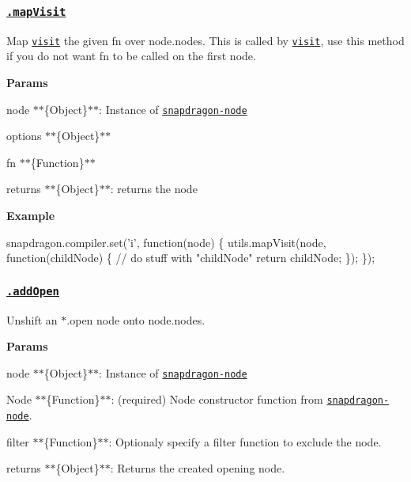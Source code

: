\subsubsection*{\href{index.js#L155}{\tt .map\+Visit}}

Map \href{#visit}{\tt visit} the given {\ttfamily fn} over {\ttfamily node.\+nodes}. This is called by \href{#visit}{\tt visit}, use this method if you do not want {\ttfamily fn} to be called on the first node.

{\bfseries Params}


\begin{DoxyItemize}
\item {\ttfamily node} $\ast$$\ast$\{Object\}$\ast$$\ast$\+: Instance of \href{https://github.com/jonschlinkert/snapdragon-node}{\tt snapdragon-\/node}
\item {\ttfamily options} $\ast$$\ast$\{Object\}$\ast$$\ast$
\item {\ttfamily fn} $\ast$$\ast$\{Function\}$\ast$$\ast$
\item {\ttfamily returns} $\ast$$\ast$\{Object\}$\ast$$\ast$\+: returns the node
\end{DoxyItemize}

{\bfseries Example}


\begin{DoxyCode}
snapdragon.compiler.set('i', function(node) \{
  utils.mapVisit(node, function(childNode) \{
    // do stuff with "childNode"
    return childNode;
  \});
\});
\end{DoxyCode}


\subsubsection*{\href{index.js#L194}{\tt .add\+Open}}

Unshift an {\ttfamily $\ast$.open} node onto {\ttfamily node.\+nodes}.

{\bfseries Params}


\begin{DoxyItemize}
\item {\ttfamily node} $\ast$$\ast$\{Object\}$\ast$$\ast$\+: Instance of \href{https://github.com/jonschlinkert/snapdragon-node}{\tt snapdragon-\/node}
\item {\ttfamily Node} $\ast$$\ast$\{Function\}$\ast$$\ast$\+: (required) Node constructor function from \href{https://github.com/jonschlinkert/snapdragon-node}{\tt snapdragon-\/node}.
\item {\ttfamily filter} $\ast$$\ast$\{Function\}$\ast$$\ast$\+: Optionaly specify a filter function to exclude the node.
\item {\ttfamily returns} $\ast$$\ast$\{Object\}$\ast$$\ast$\+: Returns the created opening node.
\end{DoxyItemize}

